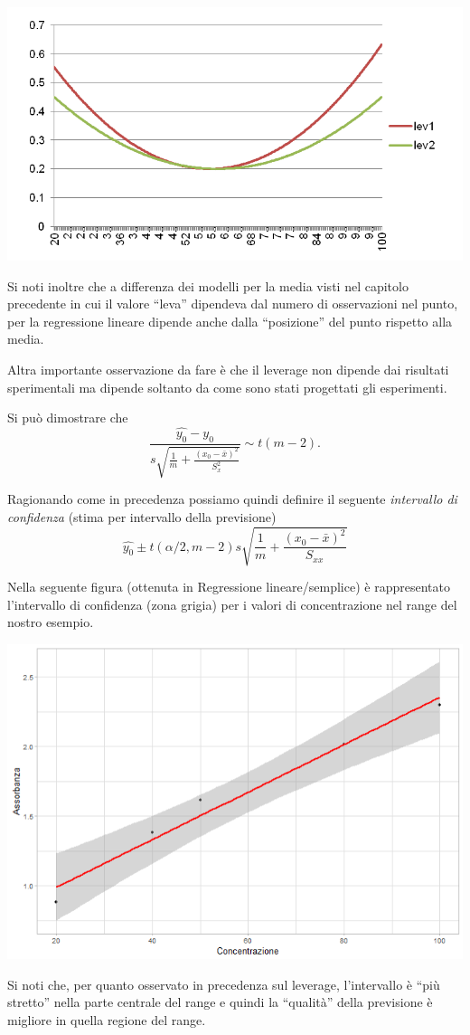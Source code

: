 \documentclass[
  11pt,
]{book}
\begin{document}
\begin{center}\includegraphics[width=0.5\linewidth]{Immagini/Regressione/11_lev} \end{center}

Si noti inoltre che a differenza dei modelli per la media visti nel capitolo precedente in cui il valore ``leva'' dipendeva dal numero di osservazioni nel punto, per la regressione lineare dipende anche dalla ``posizione'' del punto rispetto alla media.

Altra importante osservazione da fare è che il leverage non dipende dai risultati sperimentali ma dipende soltanto da come sono stati progettati gli esperimenti.

Si può dimostrare che
\[
\frac{\hat{y_0}-y_0}{s\sqrt{\frac{1}{m}+\frac{(x_0-\bar{x})^2}{S^2_{x}}}}\sim t(m-2).
\]

Ragionando come in precedenza possiamo quindi definire il seguente \emph{intervallo di confidenza} (stima per intervallo della previsione)
\[
\hat{y_0}\pm t(\alpha/2,m-2)s\sqrt{\frac{1}{m}+\frac{(x_0-\bar{x})^2}{S_{xx}}}
\]

Nella seguente figura (ottenuta in Regressione lineare/semplice) è rappresentato l'intervallo di confidenza (zona grigia) per i valori di concentrazione nel range del nostro esempio.

\begin{center}\includegraphics[width=0.5\linewidth]{Immagini/Regressione/09_int_conf_prev} \end{center}

Si noti che, per quanto osservato in precedenza sul leverage, l'intervallo è ``più stretto'' nella parte centrale del range e quindi la ``qualità'' della previsione è migliore in quella regione del range.
\end{document}
